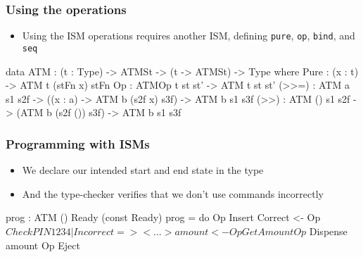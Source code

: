 \documentclass[compress,handout]{beamer}
\begin{document}
\begin{frame}[fragile]
  \frametitle{Using the operations}

  \begin{itemize}
    \item<1-> Using the ISM operations requires another ISM, defining
              \texttt{pure}, \texttt{op}, \texttt{bind}, and \texttt{seq}
  \end{itemize}

  \pause

  \begin{idrislisting}
data ATM : (t : Type) -> ATMSt -> (t -> ATMSt) -> Type
  where
  Pure : (x : t) -> ATM t (stFn x) stFn
  Op : ATMOp t st st' -> ATM t st st'
  (>>=) :  ATM a s1 s2f -> ((x : a) -> ATM b (s2f x) s3f)
        -> ATM b s1 s3f
  (>>) :  ATM () s1 s2f -> (ATM b (s2f ()) s3f)
       -> ATM b s1 s3f
  \end{idrislisting}
\end{frame}


\begin{frame}[fragile]
  \frametitle{Programming with ISMs}

  \begin{itemize}
    \item<1-> We declare our intended start and end state in the type
    \item<2-> And the type-checker verifies that we don't use commands incorrectly
  \end{itemize}

  \vspace*{-5mm}

  \pause

  \begin{idrislisting}
  prog : ATM () Ready (const Ready)
  prog = do
    Op Insert
    Correct <- Op $ CheckPIN 1234
      | Incorrect => <...>
    amount <- Op GetAmount
    Op $ Dispense amount
    Op Eject
  \end{idrislisting}

\end{frame}
\end{document}
